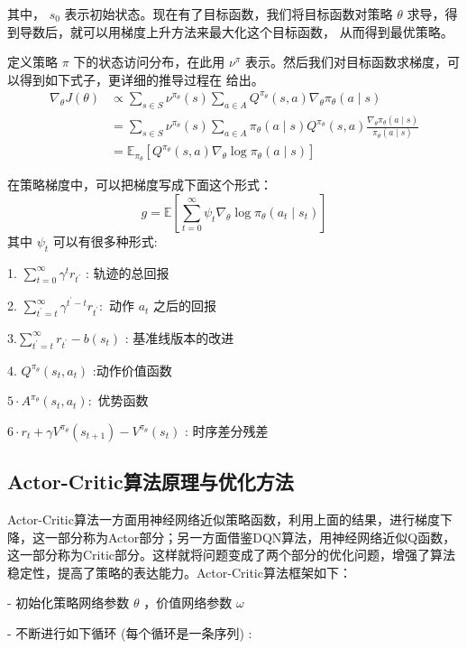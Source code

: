 其中， $s_{0}$ 表示初始状态。现在有了目标函数，我们将目标函数对策略 $\theta$ 求导，得到导数后，就可以用梯度上升方法来最大化这个目标函数， 从而得到最优策略。

定义策略 $\pi$ 下的状态访问分布，在此用 $\nu^{\pi}$ 表示。然后我们对目标函数求梯度，可以得到如下式子，更详细的推导过程在 \cite{PG}给出。
$$
\begin{aligned}
\nabla_{\theta} J(\theta) & \propto \sum_{s \in S} \nu^{\pi_{\theta}}(s) \sum_{a \in A} Q^{\pi_{\theta}}(s, a) \nabla_{\theta} \pi_{\theta}(a \mid s) \\
&=\sum_{s \in S} \nu^{\pi_{\theta}}(s) \sum_{a \in A} \pi_{\theta}(a \mid s) Q^{\pi_{\theta}}(s, a) \frac{\nabla_{\theta} \pi_{\theta}(a \mid s)}{\pi_{\theta}(a \mid s)} \\
&=\mathbb{E}_{\pi_{\theta}}\left[Q^{\pi_{\theta}}(s, a) \nabla_{\theta} \log \pi_{\theta}(a \mid s)\right]
\end{aligned}
$$

在策略梯度中，可以把梯度写成下面这个形式：
$$
g=\mathbb{E}\left[\sum_{t=0}^{\infty} \psi_{t} \nabla_{\theta} \log \pi_{\theta}\left(a_{t} \mid s_{t}\right)\right]
$$
其中 $\psi_{t}$ 可以有很多种形式:

1. $\sum_{t=0}^{\infty} \gamma^{t} r_{t^{\prime}}$ : 轨迹的总回报

2. $\sum_{t^{\prime}=t}^{\infty} \gamma^{t^{\prime}-t} r_{t^{\prime}}:$ 动作 $a_{t}$ 之后的回报

$3 . \sum_{t^{\prime}=t}^{\infty} r_{t^{\prime}}-b\left(s_{t}\right)$ : 基准线版本的改进

4. $Q^{\pi_{\theta}}\left(s_{t}, a_{t}\right)$ :动作价值函数

$5 \cdot A^{\pi_{\theta}}\left(s_{t}, a_{t}\right):$ 优势函数

$6 \cdot r_{t}+\gamma V^{\pi_{\theta}}\left(s_{t+1}\right)-V^{\pi_{\theta}}\left(s_{t}\right)$ : 时序差分残差
\subsection{Actor-Critic算法原理与优化方法}
Actor-Critic算法一方面用神经网络近似策略函数，利用上面的结果，进行梯度下降，这一部分称为Actor部分；另一方面借鉴DQN算法，用神经网络近似Q函数，这一部分称为Critic部分。这样就将问题变成了两个部分的优化问题，增强了算法稳定性，提高了策略的表达能力。Actor-Critic算法框架如下：

- 初始化策略网络参数 $\theta$ ，价值网络参数 $\omega$

- 不断进行如下循环 (每个循环是一条序列) :

